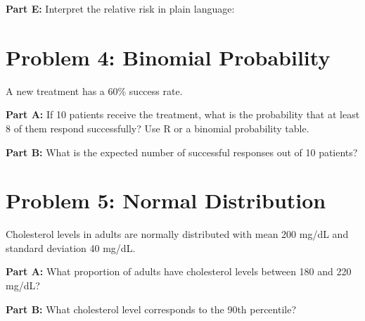 \documentclass[11pt]{article}
\begin{document}
\textbf{Part E:} Interpret the relative risk in plain language:

\vspace{2cm}

\section{Problem 4: Binomial Probability}

A new treatment has a 60\% success rate.

\vspace{12pt}

\textbf{Part A:} If 10 patients receive the treatment, what is the probability that at least 8 of them respond successfully? Use R or a binomial probability table.

\vspace{3cm}

\textbf{Part B:} What is the expected number of successful responses out of 10 patients?

\vspace{1.5cm}

\section{Problem 5: Normal Distribution}

Cholesterol levels in adults are normally distributed with mean 200 mg/dL and standard deviation 40 mg/dL.

\vspace{12pt}

\textbf{Part A:} What proportion of adults have cholesterol levels between 180 and 220 mg/dL?

\vspace{3cm}

\textbf{Part B:} What cholesterol level corresponds to the 90th percentile?

\vspace{3cm}
\end{document}
